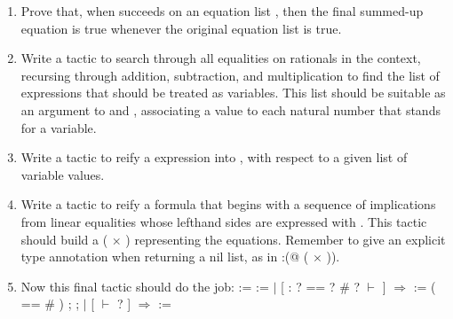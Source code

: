 \documentclass[12pt]{report}
\begin{document}
\begin{enumerate}
\begin{enumerate}
  \item Prove that, when  succeeds on an equation list , then the final summed-up equation is true whenever the original equation list is true.
  \item Write a tactic  to search through all equalities on rationals in the context, recursing through addition, subtraction, and multiplication to find the list of expressions that should be treated as variables.  This list should be suitable as an argument to  and , associating a  value to each natural number that stands for a variable.
  \item Write a tactic  to reify a  expression into , with respect to a given list of variable values.
  \item Write a tactic  to reify a formula that begins with a sequence of implications from linear equalities whose lefthand sides are expressed with .  This tactic should build a  ( \ensuremath{\times} ) representing the equations.  Remember to give an explicit type annotation when returning a nil list, as in :(@ ( \ensuremath{\times} )).
  \item Now this final tactic should do the job:
\coqdoceol
\coqdocemptyline
\coqdocindent{1.00em}
  :=\coqdoceol
\coqdocindent{2.00em}
  :=  \coqdoceol
\coqdocindent{3.00em}
   \coqdoceol
\coqdocindent{7.50em}
\ensuremath{|} [  : ? == ? \# ? \ensuremath{\vdash} \coqdocvar{\_} ] \ensuremath{\Rightarrow}\coqdoceol
\coqdocindent{8.50em}
  :=    \coqdoceol
\coqdocindent{9.50em}
 (   ==  \# )  ;\coqdoceol
\coqdocindent{9.50em}
 \coqdoceol
\coqdocindent{6.50em}
;\coqdoceol
\coqdocindent{3.00em}
  \coqdoceol
\coqdocindent{4.00em}
\ensuremath{|} [ \ensuremath{\vdash} ? ] \ensuremath{\Rightarrow}   :=   \coqdoceol

\end{enumerate}
\end{enumerate}
\end{document}

